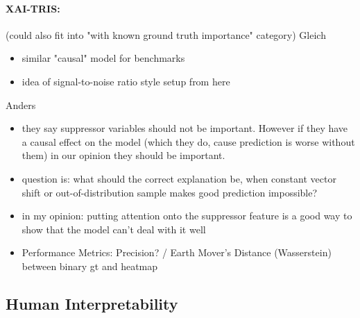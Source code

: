 \paragraph*{XAI-TRIS:}
(could also fit into "with known ground truth importance" category)
\cite{Clark2023}
Gleich
\begin{itemize}
      \item similar "causal" model for benchmarks
      \item idea of signal-to-noise ratio style setup from here
\end{itemize}

Anders
\begin{itemize}
      \item they say suppressor variables should not be important. However if they have a causal effect on the model (which they do, cause prediction is worse without them) in our opinion they should be important.
      \item question is: what should the correct explanation be, when constant vector shift or out-of-distribution sample makes good prediction impossible?
      \item in my opinion: putting attention onto the suppressor feature is a good way to show that the model can't deal with it well
      \item Performance Metrics: Precision? / Earth Mover's Distance (Wasserstein) between binary gt and heatmap
\end{itemize}


\subsection{Human Interpretability}


